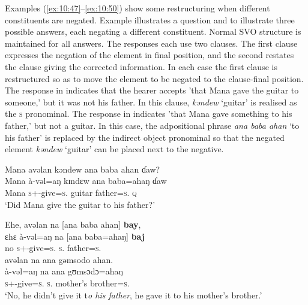 Examples (\ref{ex:10:47}--\ref{ex:10:50}) show some restructuring when different constituents are negated. Example  illustrates a question and  to  illustrate three possible answers, each negating a different constituent. Normal SVO structure is maintained for all answers. The responses each use two clauses. The first clause expresses the negation of the element in final position, and the second restates the clause giving the corrected information. In each case the first clause is restructured so as to move the element to be negated to the clause-final position. The response in  indicates that the hearer accepts 'that Mana gave the guitar to someone,' but it was not his father. In this clause, \textit{kəndew} ‘guitar’ is realised as the \textsc{s} \DO pronominal. The response in  indicates 'that Mana gave something to his father,' but not a guitar. In this case, the adpositional phrase \textit{ana baba ahan} ‘to his father’ is replaced by the indirect object pronominal so that the negated element \textit{kəndew} ‘guitar’ can be placed next to the negative. 

\ea \label{ex:10:47}
Mana  avəlan  kəndew  ana  baba  ahan  ɗaw?\\
\gll  Mana  à-vəl=aŋ     kɪndɛw  ana   baba=ahaŋ    ɗaw\\
      Mana     \textsc{s}+{\PFV}-give=\textsc{s}.{\IO}  guitar  {\DAT} father=\textsc{s}.{\POSS}  {\textsc{q}}\\
\glt  ‘Did Mana give the guitar to his father?’
\z

\ea \label{ex:10:48}
Ehe,  avəlan  na  [ana  baba  ahan]  \textbf{bay},  \\
\gll  ɛhɛ à-vəl=aŋ na [ana baba=ahaŋ] \textbf{baj}\\    
      no    \textsc{s}+{\PFV}-give=\textsc{s}.{\IO}  \textsc{s}.{\DO}  {\DAT} father=\textsc{s}.{\POSS}  {\NEG}\\ 

      \medskip
 avəlan  na  ana  gəmsodo  ahan.\\
\gll à-vəl=aŋ na ana gʊmsɔdɔ=ahaŋ\\
     \textsc{s}+{\PFV}-give=\textsc{s}.{\IO}  \textsc{s}.{\DO} {\DAT} {mother’s brother}=\textsc{s}.{\POSS} \\
\glt  ‘No, he didn’t give it t\textit{o his father}, he gave it to his mother’s brother.’
\z

